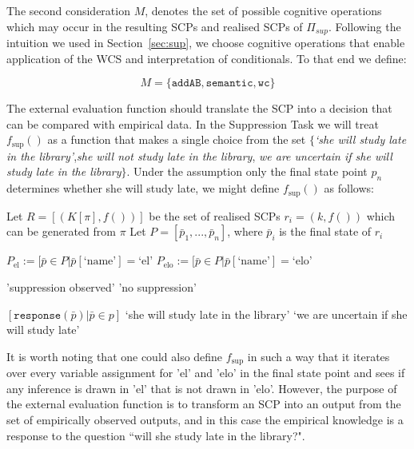 The second consideration $M$, denotes the set of possible cognitive operations which may occur in the resulting SCPs and realised SCPs of $\Pi_{sup}$. Following the intuition we used in Section~\ref{sec:sup}, we choose cognitive operations that enable application of the WCS and interpretation of conditionals. To that end we define:

\[
M=\{\texttt{addAB}, \texttt{semantic}, \texttt{wc}\}
\]

The external evaluation function should translate the SCP into a decision that can be compared with empirical data. In the Suppression Task we will treat $f_\text{sup}()$ as a function that makes a single choice from the set $\{$\textit{`she will study late in the library'},\textit{she will not study late in the library}, \textit{we are uncertain if she will study late in the library}$\}$. Under the assumption only the final state point $p_n$ determines whether she will study late, we might define $f_\text{sup}()$ as follows:

\begin{algorithm}[H] \label{evaluation:f_sup}
\SetAlgoLined
{}
{
Let $R=[(K[\pi],f())]$ be the set of realised SCPs $r_i=(k,f())$ which can be generated from $\pi$\;
Let $P=[\bar{p}_1,...,\bar{p}_n]$, where $\bar{p}_i$ is the final state of $r_i$\;

$P_\text{el}:=[\bar{p} \in P | \bar{p}[\text{`name'}]=\text{`el'}$\;
$P_\text{elo}:=[\bar{p} \in P | \bar{p}[\text{`name'}]=\text{`elo'}$\;

{
\Return 'suppression observed'
}
\Else
{
\Return 'no suppression'
}
}
{
\Return $[\texttt{response}(\bar{p}) | \bar{p} \in p]$
}
{
{
\Return `she will study late in the library'
}
{
}
\Else
{
\Return `we are uncertain if she will study late'
}
}

\caption{$\texttt{f}_\text{sup}$}
\end{algorithm}

It is worth noting that one could also define $f_\text{sup}$ in such a way that it iterates over every variable assignment for 'el' and 'elo' in the final state point and sees if any inference is drawn in 'el' that is not drawn in 'elo'. However, the purpose of the external evaluation function is to transform an SCP into an output from the set of empirically observed outputs, and in this case the empirical knowledge is a response to the question ``will she study late in the library?".

